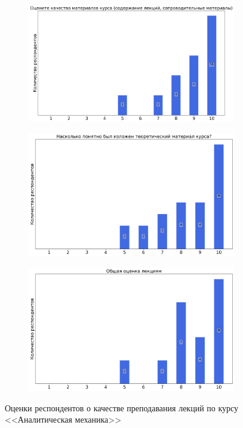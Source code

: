 \begin{figure}[H]
\begin{subfigure}[b]{0.45\textwidth}
				\includegraphics[width=\textwidth]{images/2 course/Аналитическая механика/lecturer-marks-Фомичев А.В.-1.png}
			\end{subfigure}
			\begin{subfigure}[b]{0.45\textwidth}
				\centering
				\includegraphics[width=\textwidth]{images/2 course/Аналитическая механика/lecturer-marks-Фомичев А.В.-2.png}
			\end{subfigure}	
			\begin{subfigure}[b]{0.45\textwidth}
				\centering
				\includegraphics[width=\textwidth]{images/2 course/Аналитическая механика/lecturer-marks-Фомичев А.В.-3.png}
			\end{subfigure}
			\caption{Оценки респондентов о качестве преподавания лекций по курсу <<Аналитическая механика>>}
		\end{figure}

